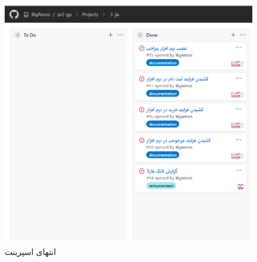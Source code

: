\documentclass[12pt,a4paper]{article}
\begin{document}
\begin{figure}[h!]
	\begin{center}
		\includegraphics[width=14cm]{images/screenshot_1.png}
	\end{center}
	\caption{انتهای اسپرینت}
\end{figure}


		
\end{document}
